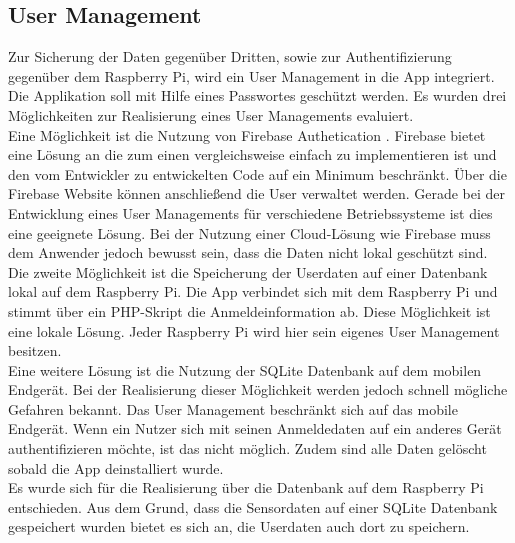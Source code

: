 \subsection{User Management}
Zur Sicherung der Daten gegenüber Dritten, sowie zur Authentifizierung gegenüber dem Raspberry Pi, wird ein User Management in die App integriert. Die Applikation soll mit Hilfe eines Passwortes geschützt werden. Es wurden drei Möglichkeiten zur Realisierung eines User Managements evaluiert.\\
Eine Möglichkeit ist die Nutzung von Firebase Authetication \cite{firebase:authentication}. Firebase bietet eine Lösung an die zum einen vergleichsweise einfach zu implementieren ist und den vom Entwickler zu entwickelten Code auf ein Minimum beschränkt. Über die Firebase Website können anschließend die User verwaltet werden. Gerade bei der Entwicklung eines User Managements für verschiedene Betriebssysteme ist dies eine geeignete Lösung. Bei der Nutzung einer Cloud-Lösung wie Firebase muss dem Anwender jedoch bewusst sein, dass die Daten nicht lokal geschützt sind.\\
Die zweite Möglichkeit ist die Speicherung der Userdaten auf einer Datenbank lokal auf dem Raspberry Pi. Die App verbindet sich mit dem Raspberry Pi und stimmt über ein PHP-Skript die Anmeldeinformation ab. Diese Möglichkeit ist eine lokale Lösung. Jeder Raspberry Pi wird hier sein eigenes User Management besitzen.\\
Eine weitere Lösung ist die Nutzung der SQLite Datenbank auf dem mobilen Endgerät. Bei der Realisierung dieser Möglichkeit werden jedoch schnell mögliche Gefahren bekannt. Das User Management beschränkt sich auf das mobile Endgerät. Wenn ein Nutzer sich mit seinen Anmeldedaten auf ein anderes Gerät authentifizieren möchte, ist das nicht möglich. Zudem sind alle Daten gelöscht sobald die App deinstalliert wurde.\\
Es wurde sich für die Realisierung über die Datenbank auf dem Raspberry Pi entschieden. Aus dem Grund, dass die Sensordaten auf einer SQLite Datenbank gespeichert wurden bietet es sich an, die Userdaten auch dort zu speichern.
